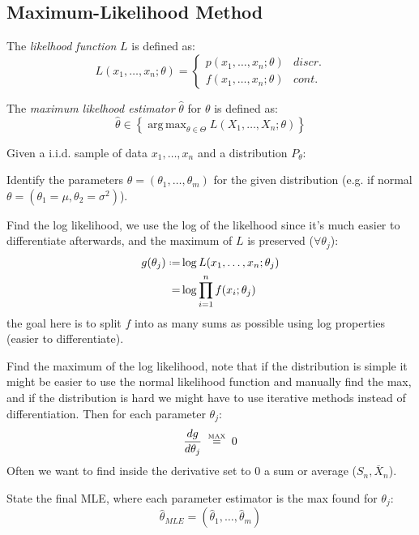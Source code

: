 \documentclass[8pt,a4paper]{extarticle}     %
\newcommand{\eqtxt}[1]{\mathrel{\stackrel{\makebox[0pt]{\mbox{\normalfont\tiny #1}}}{=}}}
\newcommand{\eqdef}{\mathrel{\vcenter{\baselineskip0.5ex\lineskiplimit0pt\hbox{\scriptsize.}\hbox{\scriptsize.}}}=}
\DeclareMathOperator*{\argmax}{arg\,max}
\begin{document}
\begin{multicols}{4}
\subsection{Maximum-Likelihood Method}

\begin{boxdefinition} 
	The \textit{likelhood function} $L$ is defined as: 
	\[
		L(x_1,\dots,x_n;\theta) =
		\begin{cases}
			p(x_1,\dots,x_n;\theta) & \textit{discr.} \\
			f(x_1,\dots,x_n;\theta)& \textit{cont.}
		\end{cases}
	\]
\end{boxdefinition}
\begin{boxdefinition}[MLE] 
	The \textit{maximum likelhood estimator} $\hat{\theta}$ for $\theta$ is defined as: 
	\[
		\hat{\theta}\in\left\{\argmax_{\theta\in\Theta}L(X_1,\dots,X_n;\theta)\right\}
	\]
\end{boxdefinition}
\begin{boxguide}[Evaluation] 
	Given a i.i.d. sample of data $x_1,\dots,x_n$ and a distribution $P_\theta$:
	\begin{listnr}
		\item Identify the parameters $\theta=(\theta_1,\dots,\theta_m)$ for the given distribution (e.g. if normal $\theta=(\theta_1=\mu,\theta_2=\sigma^2)$). 
		\item Find the log likelihood, we use the log of the likelhood since it's much easier to differentiate afterwards, and the maximum of $L$ is preserved ($\forall \theta_j$): \[
			\begin{split}
				g(\theta_j) \eqdef& \log L(x_1,\dots,x_n;\theta_j) \\ =& \log\prod_{i=1}^{n} f(x_i; \theta_j)
			\end{split}
		\]
		the goal here is to split $f$ into as many sums as possible using log properties (easier to differentiate). 
		\item Find the maximum of the log likelihood, note that if the distribution is simple it might be easier to use the normal likelihood function and manually find the max, and if the distribution is hard we might have to use iterative methods instead of differentiation. Then for each parameter $\theta_j$:		\[
			\frac{dg}{d\theta_j}\ \ \eqtxt{MAX} \ \ 0 
		\]
		Often we want to find inside the derivative set to 0 a sum or average ($S_n, \overline{X}_n$).  
		\item State the final MLE, where each parameter estimator is the max found for $\theta_j$: 	\[
			\hat{\theta}_{MLE}=(\hat{\theta}_1,\dots,\hat{\theta}_m)
		\]
	\end{listnr} 
\end{boxguide}

\end{multicols}
\end{document}

